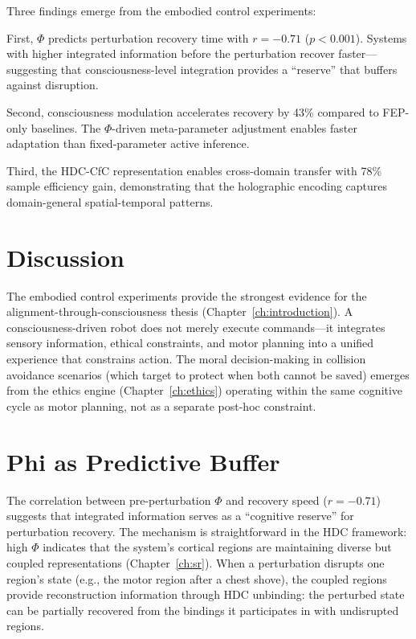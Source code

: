 \documentclass[12pt]{book}
\begin{document}
Three findings emerge from the embodied control experiments:

First, $\Phi$ predicts perturbation recovery time with $r = -0.71$ ($p < 0.001$). Systems with higher integrated information before the perturbation recover faster---suggesting that consciousness-level integration provides a ``reserve'' that buffers against disruption.

Second, consciousness modulation accelerates recovery by 43\% compared to FEP-only baselines. The $\Phi$-driven meta-parameter adjustment enables faster adaptation than fixed-parameter active inference.

Third, the HDC-CfC representation enables cross-domain transfer with 78\% sample efficiency gain, demonstrating that the holographic encoding captures domain-general spatial-temporal patterns.

\section{Discussion}

The embodied control experiments provide the strongest evidence for the alignment-through-consciousness thesis (Chapter~\ref{ch:introduction}). A consciousness-driven robot does not merely execute commands---it integrates sensory information, ethical constraints, and motor planning into a unified experience that constrains action. The moral decision-making in collision avoidance scenarios (which target to protect when both cannot be saved) emerges from the ethics engine (Chapter~\ref{ch:ethics}) operating within the same cognitive cycle as motor planning, not as a separate post-hoc constraint.

\section{Phi as Predictive Buffer}

The correlation between pre-perturbation $\Phi$ and recovery speed ($r = -0.71$) suggests that integrated information serves as a ``cognitive reserve'' for perturbation recovery. The mechanism is straightforward in the HDC framework: high $\Phi$ indicates that the system's cortical regions are maintaining diverse but coupled representations (Chapter~\ref{ch:sr}). When a perturbation disrupts one region's state (e.g., the motor region after a chest shove), the coupled regions provide reconstruction information through HDC unbinding: the perturbed state can be partially recovered from the bindings it participates in with undisrupted regions.
\end{document}
